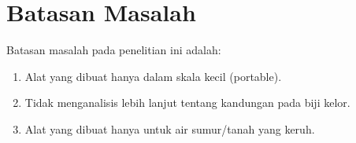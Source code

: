 \section{Batasan Masalah}

Batasan masalah pada penelitian ini adalah:

\begin{enumerate}[topsep=0pt,itemsep=0pt,partopsep=0pt, parsep=0pt]
    \item Alat yang dibuat hanya dalam skala kecil (portable).
    \item Tidak menganalisis lebih lanjut tentang kandungan pada biji kelor.
    \item Alat yang dibuat hanya untuk air sumur/tanah yang keruh.
\end{enumerate}